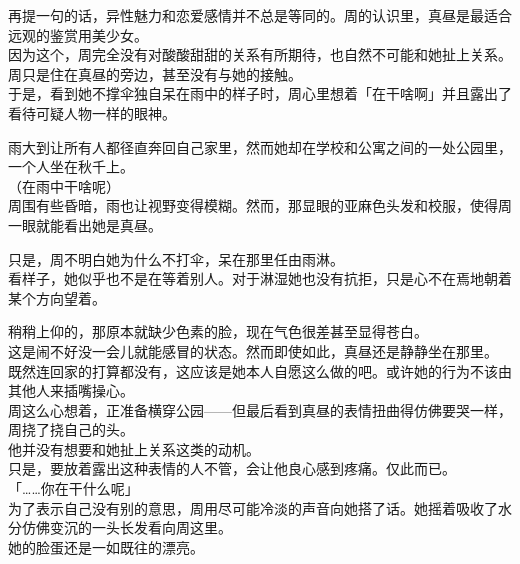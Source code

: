 再提一句的话，异性魅力和恋爱感情并不总是等同的。周的认识里，真昼是最适合远观的鉴赏用美少女。\\

因为这个，周完全没有对酸酸甜甜的关系有所期待，也自然不可能和她扯上关系。周只是住在真昼的旁边，甚至没有与她的接触。\\

于是，看到她不撑伞独自呆在雨中的样子时，周心里想着「在干啥啊」并且露出了看待可疑人物一样的眼神。\\

\vspace{2\baselineskip}

雨大到让所有人都径直奔回自己家里，然而她却在学校和公寓之间的一处公园里，一个人坐在秋千上。\\

（在雨中干啥呢）\\

周围有些昏暗，雨也让视野变得模糊。然而，那显眼的亚麻色头发和校服，使得周一眼就能看出她是真昼。

只是，周不明白她为什么不打伞，呆在那里任由雨淋。\\

看样子，她似乎也不是在等着别人。对于淋湿她也没有抗拒，只是心不在焉地朝着某个方向望着。

稍稍上仰的，那原本就缺少色素的脸，现在气色很差甚至显得苍白。\\

这是闹不好没一会儿就能感冒的状态。然而即使如此，真昼还是静静坐在那里。\\

既然连回家的打算都没有，这应该是她本人自愿这么做的吧。或许她的行为不该由其他人来插嘴操心。\\

周这么心想着，正准备横穿公园——但最后看到真昼的表情扭曲得仿佛要哭一样，周挠了挠自己的头。\\

他并没有想要和她扯上关系这类的动机。\\

只是，要放着露出这种表情的人不管，会让他良心感到疼痛。仅此而已。\\

「……你在干什么呢」\\

为了表示自己没有别的意思，周用尽可能冷淡的声音向她搭了话。她摇着吸收了水分仿佛变沉的一头长发看向周这里。\\

她的脸蛋还是一如既往的漂亮。

